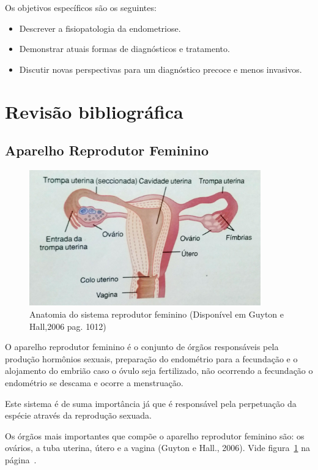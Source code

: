 \documentclass[12pt]{article} %
\begin{document}
Os objetivos específicos são os seguintes:

\begin{itemize}
\item Descrever a fisiopatologia da endometriose.
\item Demonstrar atuais formas de diagnósticos e tratamento.
\item Discutir novas perspectivas para um diagnóstico precoce e menos
invasivos.
\end{itemize}
\newpage

\section{Revisão bibliográfica}

\subsection{Aparelho Reprodutor Feminino}
\begin{figure}[h!]
\centering
\includegraphics[width=10cm]{utero.jpg}
\caption[Anatomia do sistema reprodutor feminino]{Anatomia do sistema reprodutor feminino (Disponível em Guyton e Hall,2006 pag. 1012)}
\label{aparelho feminino}
\end{figure}

O aparelho reprodutor feminino é o conjunto de órgãos responsáveis
pela produção hormônios sexuais, preparação do
endométrio para a fecundação e o alojamento do embrião caso o óvulo seja
fertilizado, não ocorrendo a fecundação o endométrio se descama e ocorre a menstruação. 

Este sistema é de suma
importância já que é responsável pela perpetuação da espécie através
da reprodução sexuada.

Os órgãos mais importantes que compõe o
aparelho reprodutor feminino são: os ovários, a tuba uterina, útero e
a vagina (Guyton e Hall., 2006). Vide figura~\ref{aparelho feminino}
na página~\pageref{aparelho feminino}.
\end{document}
